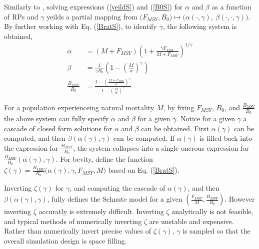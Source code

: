 \documentclass[12pt]{article}
\begin{document}
%
Similarly to , solving expressions 
(\ref{yeildS}) and (\ref{B0S}) for $\alpha$ and $\beta$ as a function of RPs 
and $\gamma$ yeilds a partial mapping from 
$\big(F_{MSY}, B_0\big) \mapsto \big(\alpha(\cdot, \gamma), ~\beta(\cdot, \cdot, \gamma)\big)$.
By further working with Eq. (\ref{BratS}), to identify $\gamma$, the following 
system is obtained,
%
\begin{align}
\alpha &= (M+F_{MSY})\left(1+\frac{\gamma F_{MSY}}{M+F_{MSY}}\right)^{1/\gamma} \nonumber\\
\beta &= \frac{1}{\gamma B_0}\left(1-\left(\frac{M}{\alpha}\right)^\gamma\right) \label{abgSys}\\
\frac{B_{MSY}}{B_0} &= \frac{1-\left(\frac{M+F_{MSY}}{\alpha}\right)^\gamma}{ 1-\left(\frac{M}{\alpha}\right)^\gamma } \nonumber.
\end{align}

%
For a population experienceing natural mortality $M$, by fixing $F_{MSY}$, 
$B_0$, and $\frac{B_{MSY}}{B_0}$ the above system can fully specify $\alpha$ 
and $\beta$ for a given $\gamma$. %
Notice for a given $\gamma$ a cascade of closed form solutions for $\alpha$ 
and $\beta$ can be obtained. First $\alpha(\gamma)$ can be computed, and then 
$\beta(\alpha(\gamma), \gamma)$ can be computed. If $\alpha(\gamma)$ is filled 
back into the expression for $\frac{B_{MSY}}{B_0}$, the system collapses into 
a single onerous expression for $\frac{B_{MSY}}{B_0}(\alpha(\gamma), \gamma)$. 
For bevity, define the function \mbox{$\zeta(\gamma)=\frac{B_{MSY}}{B_0}\big(\alpha(\gamma), \gamma, F_{MSY}, M\big)$} based on Eq. (\ref{BratS}). 

Inverting $\zeta(\gamma)$ for $\gamma$, and computing the cascade of 
$\alpha(\gamma)$, and then $\beta(\alpha(\gamma), \gamma)$, fully defines the 
Schnute model for a given $(\frac{F_{MSY}}{M}, \frac{B_{MSY}}{B_0})$. However
inverting $\zeta$ accuratly is extremely difficult. Inverting $\zeta$ 
analytically is not feasible, and typical methods of numerically inverting 
$\zeta$ are unstable and expensive. 
%
Rather than numerically invert precise values of $\zeta(\gamma)$, $\gamma$ is 
sampled so that the overall simulation design is space filling.
\end{document}
